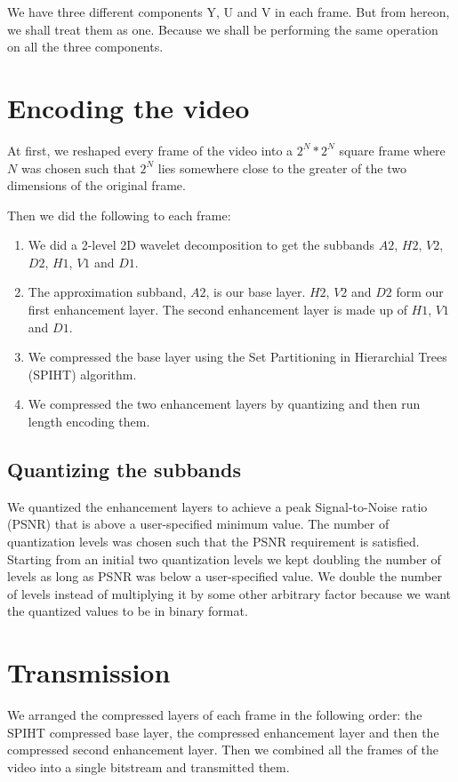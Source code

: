 \documentclass[10pt,twocolumn]{article}
\begin{document}
We have three different components Y, U and V in each frame. But from hereon, we shall treat them as one. Because we shall be performing the same operation on all the three components.

\section{Encoding the video}

At first, we reshaped every frame of the video into a $2^N * 2^N$ square frame where $N$ was chosen such that $2^N$ lies somewhere close to the greater of the two dimensions of the original frame.

Then we did the following to each frame:
\begin{enumerate}
    \item We did a 2-level 2D wavelet decomposition to get the subbands $A2$, $H2$, $V2$, $D2$, $H1$, $V1$ and $D1$.
    \item The approximation subband, $A2$, is our base layer. $H2$, $V2$ and $D2$ form our first enhancement layer. The second enhancement layer is made up of $H1$, $V1$ and $D1$.
    \item We compressed the base layer using the Set Partitioning in Hierarchial Trees (SPIHT) algorithm\cite{amirSaid1996}.
    \item We compressed the two enhancement layers by quantizing and then run length encoding them.
\end{enumerate}

\subsection*{Quantizing the subbands}

We quantized the enhancement layers to achieve a peak Signal-to-Noise ratio (PSNR) that is above a user-specified minimum value. The number of quantization levels was chosen such that the PSNR requirement is satisfied. Starting from an initial two quantization levels we kept  doubling the number of levels as long as PSNR was below a user-specified value. We double the number of levels instead of multiplying it by some other arbitrary factor because we want the quantized values to be in binary format.

\section{Transmission}

We arranged the compressed layers of each frame in the following order: the SPIHT compressed base layer, the compressed enhancement layer and then the compressed second enhancement layer.
Then we combined all the frames of the video into a single bitstream and transmitted them.
\end{document}
